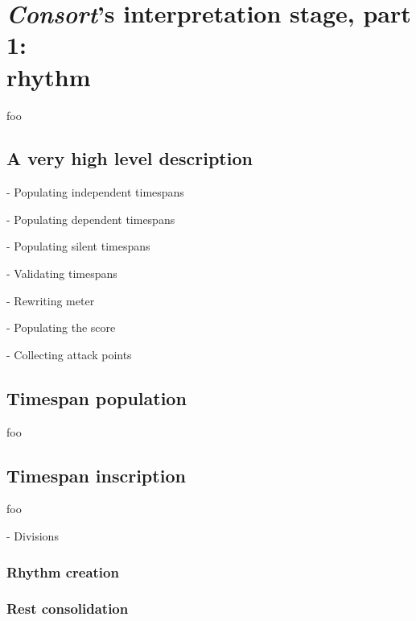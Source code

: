 \chapter[\emph{Consort}'s interpretation stage, part 1: rhythm]{
    \emph{Consort}'s interpretation stage, part 1:\\ rhythm}

foo

\section{A very high level description}

- Populating independent timespans

- Populating dependent timespans

- Populating silent timespans

- Validating timespans

- Rewriting meter

- Populating the score

- Collecting attack points

\section{Timespan population}

foo

\section{Timespan inscription}

foo

- Divisions

\subsection{Rhythm creation}

\subsection{Rest consolidation}

